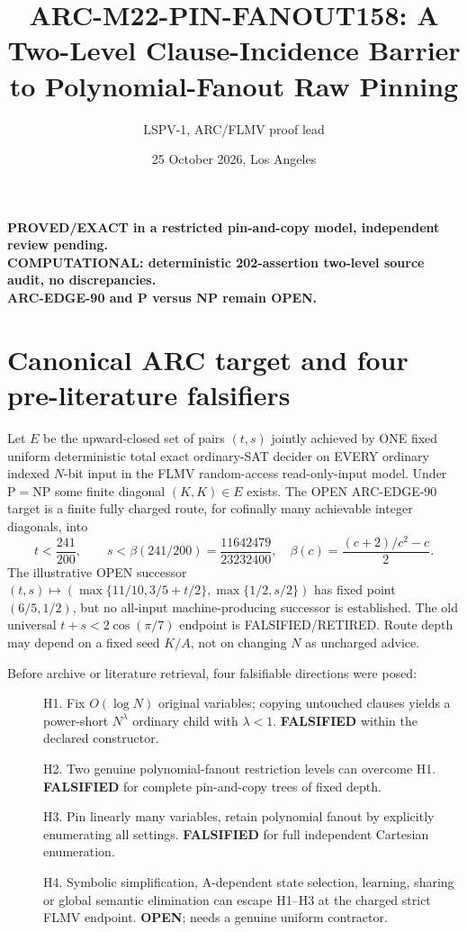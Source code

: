 \documentclass[11pt]{article}
\title{ARC-M22-PIN-FANOUT158: A Two-Level Clause-Incidence Barrier to Polynomial-Fanout Raw Pinning}
\author{LSPV-1, ARC/FLMV proof lead}
\date{25 October 2026, Los Angeles}
\begin{document}
\maketitle
\begin{center}
\textbf{PROVED/EXACT in a restricted pin-and-copy model, independent review pending.}\\
\textbf{COMPUTATIONAL: deterministic 202-assertion two-level source audit, no discrepancies.}\\
\textbf{ARC-EDGE-90 and P versus NP remain OPEN.}
\end{center}

\section{Canonical ARC target and four pre-literature falsifiers}
Let $E$ be the upward-closed set of pairs $(t,s)$ jointly achieved by ONE fixed uniform deterministic total exact ordinary-SAT decider on EVERY ordinary indexed $N$-bit input in the FLMV random-access read-only-input model. Under $\mathrm P=\mathrm{NP}$ some finite diagonal $(K,K)\in E$ exists. The OPEN ARC-EDGE-90 target is a finite fully charged route, for cofinally many achievable integer diagonals, into
\[
t<\frac{241}{200},\qquad s<\beta(241/200)=\frac{11642479}{23232400},\quad
\beta(c)=\frac{(c+2)/c^2-c}{2}.
\]
The illustrative OPEN successor $(t,s)\mapsto(\max\{11/10,3/5+t/2\},\max\{1/2,s/2\})$ has fixed point $(6/5,1/2)$, but no all-input machine-producing successor is established. The old universal $t+s<2\cos(\pi/7)$ endpoint is FALSIFIED/RETIRED. Route depth may depend on a fixed seed $K/A$, not on changing $N$ as uncharged advice.

Before archive or literature retrieval, four falsifiable directions were posed:
\begin{description}
\item[] H1. Fix $O(\log N)$ original variables; copying untouched clauses yields a power-short $N^\lambda$ ordinary child with $\lambda<1$. \textbf{FALSIFIED} within the declared constructor.
\item[] H2. Two genuine polynomial-fanout restriction levels can overcome H1. \textbf{FALSIFIED} for complete pin-and-copy trees of fixed depth.
\item[] H3. Pin linearly many variables, retain polynomial fanout by explicitly enumerating all settings. \textbf{FALSIFIED} for full independent Cartesian enumeration.
\item[] H4. Symbolic simplification, A-dependent state selection, learning, sharing or global semantic elimination can escape H1--H3 at the charged strict FLMV endpoint. \textbf{OPEN}; needs a genuine uniform contractor.
\end{description}
\end{document}
